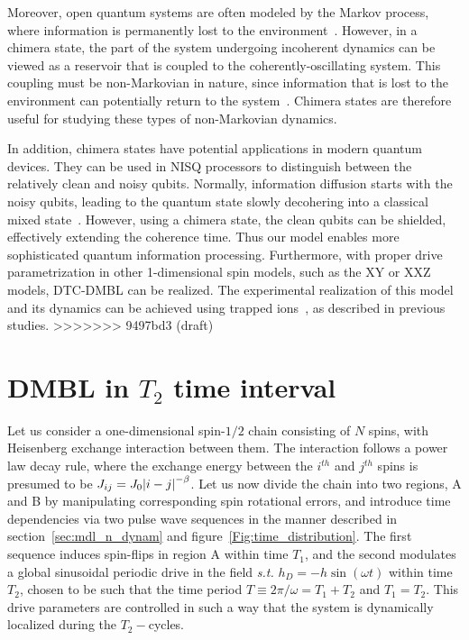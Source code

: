 \documentclass[12pt]{iopart}
\begin{document}
Moreover, open quantum systems are often modeled by the Markov process, where information is permanently lost to the environment~\cite{Agarwal2012, Gorini1976}. However, in a chimera state, the part of the system undergoing incoherent dynamics can be viewed as a reservoir that is coupled to the coherently-oscillating system.
This coupling must be non-Markovian in nature, since information that is lost to the environment can potentially return to the system~\cite{Accardi1976,Lindblad1976}. Chimera states are therefore useful for studying these types of non-Markovian dynamics.

In addition, chimera states have potential applications in modern quantum devices. They can be used in NISQ processors to distinguish between the relatively clean and noisy qubits. Normally, information diffusion starts with the noisy qubits, leading to the quantum state slowly decohering into a classical mixed state~\cite{Bharti2022}. However, using a chimera state, the clean qubits can be shielded, effectively extending the coherence time. Thus our model enables more sophisticated quantum information processing. Furthermore, with proper drive parametrization in other 1-dimensional spin models, such as the XY or XXZ models, DTC-DMBL can be realized. The experimental realization of this model and its dynamics can be achieved using trapped ions~\cite{sakurai_phys_nodate, Friedenauer2008}, as described in previous studies.
>>>>>>> 9497bd3 (draft)
	
\medskip

\clearpage

\appendix
\section{\label{sec:AppendixA} DMBL in $T_2$ time interval}

Let us consider a one-dimensional spin-$1/2$ chain consisting of $N$ spins, with Heisenberg exchange interaction between them. The interaction follows a power law decay rule, where the exchange energy between the $i^{th}$ and $j^{th}$ spins is presumed to be  $J_{ij}=J_0\abs{i-j}^{-\beta}$. Let us now  divide the chain into two regions, A and B by manipulating corresponding spin rotational errors, and introduce time dependencies via two pulse wave sequences in the manner described in section~\ref{sec:mdl_n_dynam} and figure~\ref{Fig:time_distribution}. The first sequence  induces spin-flips in region A within time $T_1$, and the second modulates a global sinusoidal periodic drive in the field \textit{s.t.} $h_D = -h\sin(\omega t)$ within time $T_2$, chosen to be such that the time period $T\equiv 2\pi/\omega = T_1 + T_2$ and $T_1 = T_2$. This drive parameters are controlled in such a way that the system is dynamically localized during the $T_2-$cycles.
\end{document}
